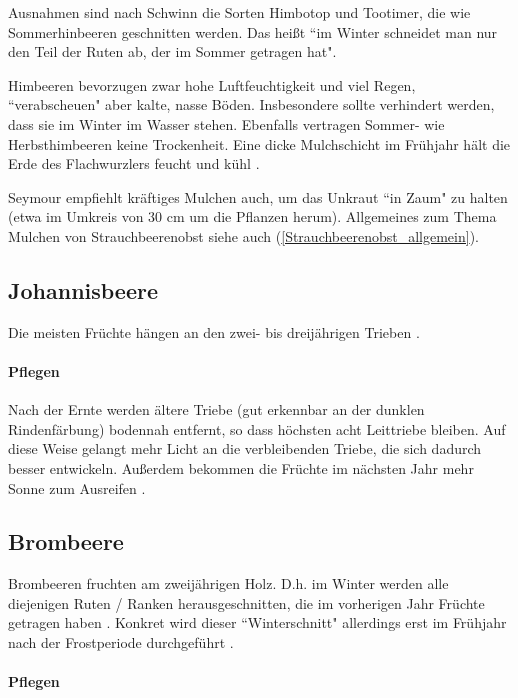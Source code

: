 Ausnahmen sind nach Schwinn \cite{Schwinn2022} die Sorten Himbotop und Tootimer, die wie Sommerhinbeeren geschnitten werden.
Das heißt ``im Winter schneidet man nur den Teil der Ruten ab, der im Sommer getragen hat".

Himbeeren bevorzugen zwar hohe Luftfeuchtigkeit und viel Regen, ``verabscheuen" aber kalte, nasse Böden.
Insbesondere sollte verhindert werden, dass sie im Winter im Wasser stehen.
Ebenfalls vertragen Sommer- wie Herbsthimbeeren keine Trockenheit.
Eine dicke Mulchschicht im Frühjahr hält die Erde des Flachwurzlers feucht und kühl \cite[S.~421]{Don2021}.

Seymour \cite[S.~176]{Seymour1978} empfiehlt kräftiges Mulchen auch, um das Unkraut ``in Zaum" zu halten (etwa im Umkreis von 30 cm um die Pflanzen herum).
Allgemeines zum Thema Mulchen von Strauchbeerenobst siehe auch (\ref{Strauchbeerenobst_allgemein}).

\subsection{Johannisbeere}
\label{Johannisbeere}

Die meisten Früchte hängen an den zwei- bis dreijährigen Trieben \cite[S.~108]{Heberer2018}.

\paragraph{Pflegen}

Nach der Ernte werden ältere Triebe (gut erkennbar an der dunklen Rindenfärbung) bodennah entfernt, so dass höchsten acht Leittriebe bleiben.
Auf diese Weise gelangt mehr Licht an die verbleibenden Triebe, die sich dadurch besser entwickeln.
Außerdem bekommen die Früchte im nächsten Jahr mehr Sonne zum Ausreifen \cite[S.~108]{Heberer2018}.

\subsection{Brombeere}
\label{Brombeere}

Brombeeren fruchten am zweijährigen Holz.
D.h. im Winter werden alle diejenigen Ruten / Ranken herausgeschnitten, die im vorherigen Jahr Früchte getragen haben \cite[S.~176]{Seymour1978}.
Konkret wird dieser ``Winterschnitt" allerdings erst im Frühjahr nach der Frostperiode durchgeführt \cite[S.~196]{Stangl1995}.

\paragraph{Pflegen}

